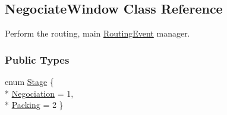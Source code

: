 \hypertarget{classKite_1_1NegociateWindow}{\subsection{Negociate\-Window Class Reference}
\label{classKite_1_1NegociateWindow}
}


Perform the routing, main \hyperlink{classKite_1_1RoutingEvent}{Routing\-Event} manager.  


\subsubsection*{Public Types}
\begin{DoxyCompactItemize}
\item 
enum \hyperlink{classKite_1_1NegociateWindow_aca8133200c1122e29b87b314d82604eb}{Stage} \{ \\*
\hyperlink{classKite_1_1NegociateWindow_aca8133200c1122e29b87b314d82604eba19ccda3133337a5db697480ebfd6097f}{Negociation} = 1, 
\\*
\hyperlink{classKite_1_1NegociateWindow_aca8133200c1122e29b87b314d82604ebabdd3263d9492edf336ac52b4a9776b82}{Packing} = 2
 \}
\end{DoxyCompactItemize}
